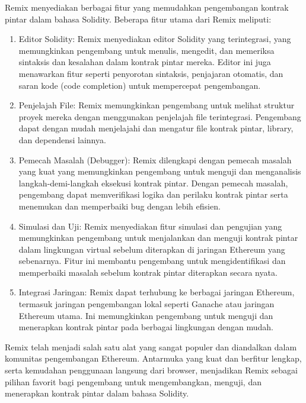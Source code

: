 Remix menyediakan berbagai fitur yang memudahkan pengembangan kontrak pintar dalam bahasa Solidity. Beberapa fitur utama dari Remix meliputi:

\begin{enumerate}
  \item Editor Solidity: Remix menyediakan editor Solidity yang terintegrasi, yang memungkinkan pengembang untuk menulis, mengedit, dan memeriksa sintaksis dan kesalahan dalam kontrak pintar mereka. Editor ini juga menawarkan fitur seperti penyorotan sintaksis, penjajaran otomatis, dan saran kode (code completion) untuk mempercepat pengembangan.
  \item Penjelajah File: Remix memungkinkan pengembang untuk melihat struktur proyek mereka dengan menggunakan penjelajah file terintegrasi. Pengembang dapat dengan mudah menjelajahi dan mengatur file kontrak pintar, library, dan dependensi lainnya.
  \item Pemecah Masalah (Debugger): Remix dilengkapi dengan pemecah masalah yang kuat yang memungkinkan pengembang untuk menguji dan menganalisis langkah-demi-langkah eksekusi kontrak pintar. Dengan pemecah masalah, pengembang dapat memverifikasi logika dan perilaku kontrak pintar serta menemukan dan memperbaiki bug dengan lebih efisien.
  \item Simulasi dan Uji: Remix menyediakan fitur simulasi dan pengujian yang memungkinkan pengembang untuk menjalankan dan menguji kontrak pintar dalam lingkungan virtual sebelum diterapkan di jaringan Ethereum yang sebenarnya. Fitur ini membantu pengembang untuk mengidentifikasi dan memperbaiki masalah sebelum kontrak pintar diterapkan secara nyata.
  \item Integrasi Jaringan: Remix dapat terhubung ke berbagai jaringan Ethereum, termasuk jaringan pengembangan lokal seperti Ganache atau jaringan Ethereum utama. Ini memungkinkan pengembang untuk menguji dan menerapkan kontrak pintar pada berbagai lingkungan dengan mudah.
\end{enumerate}

Remix telah menjadi salah satu alat yang sangat populer dan diandalkan dalam komunitas pengembangan Ethereum. Antarmuka yang kuat dan berfitur lengkap, serta kemudahan penggunaan langsung dari browser, menjadikan Remix sebagai pilihan favorit bagi pengembang untuk mengembangkan, menguji, dan menerapkan kontrak pintar dalam bahasa Solidity.

